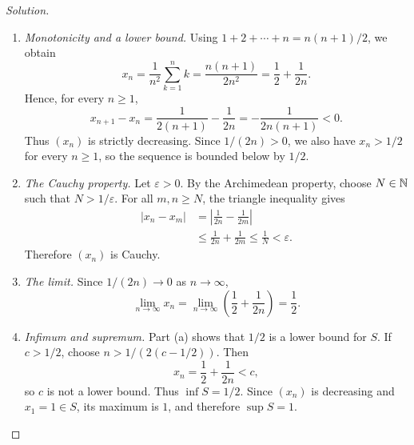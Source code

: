 \begingroup
\renewcommand{\labelenumi}{(\alph{enumi})}
\allowdisplaybreaks[1]

\begin{proof}[Solution]
\leavevmode
\begin{enumerate}
  \item \textit{Monotonicity and a lower bound.}
    Using $1+2+\cdots+n=n(n+1)/2$, we obtain
    \[
      x_n=\frac1{n^2}\sum_{k=1}^n k
        =\frac{n(n+1)}{2n^2}
        =\frac12+\frac1{2n}.
    \]
    Hence, for every $n\geq1$,
    \[
      x_{n+1}-x_n
        =\frac1{2(n+1)}-\frac1{2n}
        =-\frac1{2n(n+1)}<0.
    \]
    Thus $(x_n)$ is strictly decreasing. Since $1/(2n)>0$,
    we also have $x_n>1/2$ for every $n\geq1$, so the sequence
    is bounded below by $1/2$.

  \item \textit{The Cauchy property.}
    Let $\varepsilon>0$. By the Archimedean property, choose
    $N\in\mathbb{N}$ such that $N>1/\varepsilon$. For all $m,n\geq N$,
    the triangle inequality gives
    \[
      \begin{aligned}
        |x_n-x_m|
          &=\left|\frac1{2n}-\frac1{2m}\right|\\
          &\leq\frac1{2n}+\frac1{2m}
          \leq\frac1N<\varepsilon.
      \end{aligned}
    \]
    Therefore $(x_n)$ is Cauchy.

  \item \textit{The limit.}
    Since $1/(2n)\to0$ as $n\to\infty$,
    \[
      \lim_{n\to\infty}x_n
        =\lim_{n\to\infty}\left(\frac12+\frac1{2n}\right)
        =\frac12.
    \]

  \item \textit{Infimum and supremum.}
    Part (a) shows that $1/2$ is a lower bound for $S$.
    If $c>1/2$, choose $n>1/(2(c-1/2))$. Then
    \[
      x_n=\frac12+\frac1{2n}<c,
    \]
    so $c$ is not a lower bound. Thus $\inf S=1/2$.
    Since $(x_n)$ is decreasing and $x_1=1\in S$, its maximum
    is $1$, and therefore $\sup S=1$.
\end{enumerate}
\end{proof}
\endgroup
